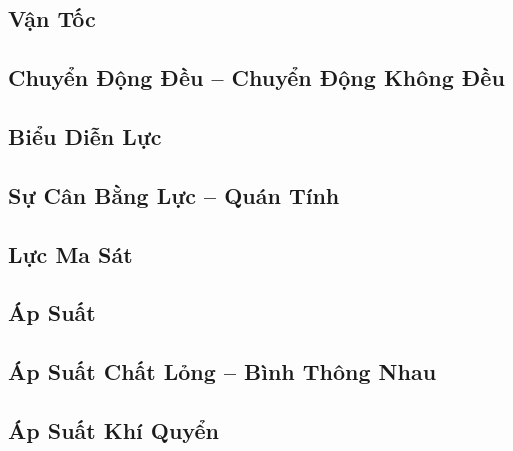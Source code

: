 \documentclass{article}
\numberwithin{equation}{section}
\begin{document}
\subsection{Vận Tốc}


\subsection{Chuyển Động Đều -- Chuyển Động Không Đều}


\subsection{Biểu Diễn Lực}


\subsection{Sự Cân Bằng Lực -- Quán Tính}


\subsection{Lực Ma Sát}


\subsection{Áp Suất}


\subsection{Áp Suất Chất Lỏng -- Bình Thông Nhau}


\subsection{Áp Suất Khí Quyển}
\end{document}
